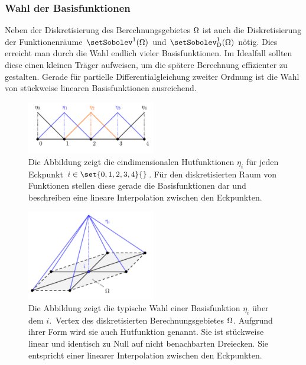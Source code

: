 \documentclass[crop=false]{standalone}
\begin{document}
      \subsubsection{Wahl der Basisfunktionen}
        Neben der Diskretisierung des Berechnungsgebietes $\Omega$ ist auch die Diskretisierung der Funktionenräume $\setSobolev^1(\domain)$ und $\setSobolev^1_\mathrm{D}(\domain)$ nötig.
        Dies erreicht man durch die Wahl endlich vieler Basisfunktionen.
        Im Idealfall sollten diese einen kleinen Träger aufweisen, um die spätere Berechnung effizienter zu gestalten.
        Gerade für partielle Differentialgleichung zweiter Ordnung ist die Wahl von stückweise linearen Basisfunktionen ausreichend.
        \begin{figure}[h]
          \center
          \includegraphics[width=0.5\textwidth]{images/hat_function_one_dimension_example.pdf}
          \caption[Eindimensionale Hutfunktionen]{%
            Die Abbildung zeigt die eindimensionalen Hutfunktionen $η_i$ für jeden Eckpunkt $i\in\set{0,1,2,3,4}{}$.
            Für den diskretisierten Raum von Funktionen stellen diese gerade die Basisfunktionen dar und beschreiben eine lineare Interpolation zwischen den Eckpunkten.
          }
          \label{fig:hat-function-example}
        \end{figure}
        \begin{figure}[h]
          \center
          \includegraphics[width=0.5\textwidth]{images/hat_function.pdf}
          \caption[Zweidimensionale Hutfunktion]{%
            Die Abbildung zeigt die typische Wahl einer Basisfunktion $η_i$ über dem $i$.~Vertex des diskretisierten Berechnungsgebietes $\Omega$.
            Aufgrund ihrer Form wird sie auch Hutfunktion genannt.
            Sie ist stückweise linear und identisch zu Null auf nicht benachbarten Dreiecken.
            Sie entspricht einer linearer Interpolation zwischen den Eckpunkten.
          }
          \label{fig:hat-function}
        \end{figure}
\end{document}
